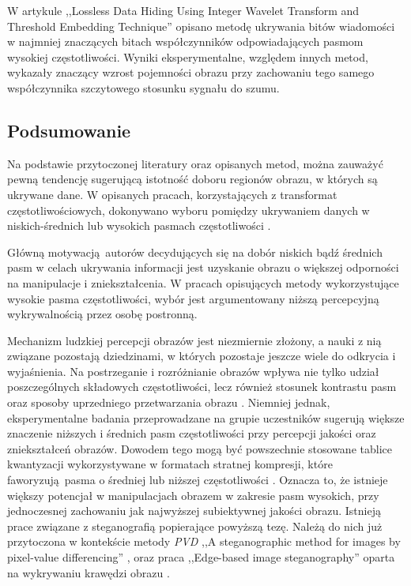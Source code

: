 {{{            W artykule ,,Lossless Data Hiding Using Integer Wavelet Transform and Threshold Embedding Technique''
            \cite{Xuan2005LosslessDH} opisano metodę ukrywania bitów wiadomości w najmniej znaczących bitach
            współczynników odpowiadających pasmom wysokiej częstotliwości. Wyniki eksperymentalne, względem innych
            metod, wykazały znaczący wzrost pojemności obrazu przy zachowaniu tego samego współczynnika szczytowego
            stosunku sygnału do szumu.
        }

        \subsection{Podsumowanie}
        {
            Na podstawie przytoczonej literatury oraz opisanych metod, można zauważyć pewną tendencję sugerującą
            istotność doboru regionów obrazu, w których są ukrywane dane. W opisanych pracach, korzystających z
            transformat częstotliwościowych, dokonywano wyboru pomiędzy ukrywaniem danych w
            niskich-średnich \cite{Huang2000EmbeddingIW, DataHidinginJPEG, Li2007ASM} lub wysokich pasmach
            częstotliwości \cite{Xuan2005LosslessDH, Muhuri2020ANI}.

            Główną motywacją autorów decydujących się na dobór niskich bądź średnich pasm w celach ukrywania informacji
            jest uzyskanie obrazu o większej odporności na manipulacje i zniekształcenia. W pracach opisujących metody
            wykorzystujące wysokie pasma częstotliwości, wybór jest argumentowany niższą percepcyjną wykrywalnością
            przez osobę postronną.

            Mechanizm ludzkiej percepcji obrazów jest niezmiernie złożony, a nauki z nią związane pozostają dziedzinami,
            w których pozostaje jeszcze wiele do odkrycia i wyjaśnienia. Na postrzeganie i rozróżnianie obrazów wpływa
            nie tylko udział poszczególnych składowych częstotliwości, lecz również stosunek kontrastu pasm oraz sposoby
            uprzedniego przetwarzania obrazu \cite{Perfetto2020EffectsOS}. Niemniej jednak, eksperymentalne badania
            przeprowadzane na grupie uczestników sugerują większe znaczenie niższych i średnich pasm częstotliwości przy
            percepcji jakości oraz zniekształceń obrazów. Dowodem tego mogą być powszechnie stosowane tablice
            kwantyzacji wykorzystywane w formatach stratnej kompresji, które faworyzują pasma o średniej lub niższej
            częstotliwości \cite{ImageCompressionDCT}. Oznacza to, że istnieje większy potencjał w manipulacjach obrazem
            w zakresie pasm wysokich, przy jednoczesnej zachowaniu jak najwyższej subiektywnej jakości obrazu. Istnieją
            prace związane z steganografią popierające powyższą tezę. Należą do nich już przytoczona w kontekście metody
            \textit{PVD} ,,A steganographic method for images by pixel-value differencing'' \cite{Wu2003ASM}, oraz praca
            ,,Edge-based image steganography'' oparta na wykrywaniu krawędzi obrazu \cite{Islam2014EdgebasedIS}.
        }
    }
}

